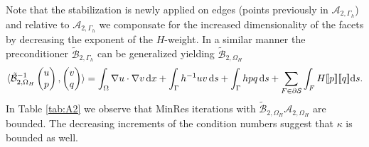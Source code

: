 Note that the stabilization is newly applied on edges
(points previously in $\mathcal{A}_{2, \Gamma_h}$) and relative to $\mathcal{A}_{2, \Gamma_h}$
we componsate for the increased dimensionality of the facets by decreasing
the exponent of the $H$-weight. In a similar manner
the preconditioner $\tilde{\mathcal{B}}_{2, \Gamma_h}$ can be generalized
yielding $\tilde{\mathcal{B}}_{2, \Omega_H}$
\[
\langle
\tilde{\mathcal{B}}^{-1}_{2, \Omega_H}\begin{pmatrix}u\\p\end{pmatrix},
  \begin{pmatrix}v\\q\end{pmatrix}
\rangle
    =
    \int_{\Omega}\nabla u\cdot\nabla v\,\mathrm{d}x + \int_{\Gamma}h^{-1}u v\,\mathrm{d}s + \int_{\Gamma} h p q\,\mathrm{d}s
    + \sum_{F\in\partial\mathcal{S}}\int_{F}H[\![p]\!][\![q]\!] \mathrm{d}s.
\]
In Table \ref{tab:A2} we observe that MinRes iterations with
$\tilde{\mathcal{B}}_{2, \Omega_H}\mathcal{A}_{2, \Omega_H}$ are bounded. The decreasing
increments of the condition numbers suggest that $\kappa$ is bounded as well.


